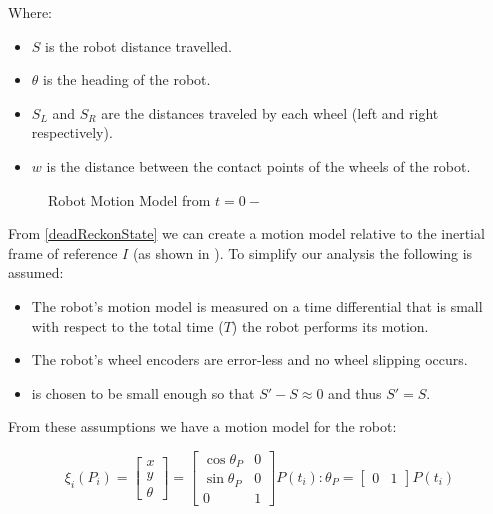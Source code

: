 \documentclass[main.tex]{subfiles}
\begin{document}
Where:
\begin{itemize}
\item $S$ is the robot distance travelled.
\item $\theta$ is the heading of the robot.
\item $S_L$ and $S_R$ are the distances traveled by each wheel (left and right
respectively).
\item $w$ is the distance between the contact points of the
wheels of the robot.
\end{itemize}

\begin{figure}[H]
	\begin{center}
	
	\end{center}
	\caption{Robot Motion Model from $t=0 -$ \delt}
	\label{fig:2wrMotion}
\end{figure}


From \eqref{deadReckonState} we can create a motion model relative to the
inertial frame of reference $I$ (as shown in ). To simplify
our analysis the following is assumed:

\begin{itemize}
\item The robot's motion model is measured on a time differential \delt that
is small with respect to the total time ($T$) the robot performs its motion. 
\item The robot's wheel encoders are error-less and no wheel slipping occurs.
\item \delt is chosen to be small enough so that $S\mathrm{'}-S \approx 0$ and
thus $S\mathrm{'} = S$.
\end{itemize}

From these assumptions we have a motion model for the robot:

\begin{equation}
\label{eq:motionState}
\xi_{i}(P_i) = 
\begin{bmatrix}
x \\ y \\ \theta
\end{bmatrix}
=
\begin{bmatrix}
\cos{\theta_P} & 0\\
\sin{\theta_P} & 0\\
0 & 1
\end{bmatrix}
P(t_i) : \theta_P = 
\begin{bmatrix}
	0 & 1
\end{bmatrix}
P(t_i)
\end{equation}
\end{document}
